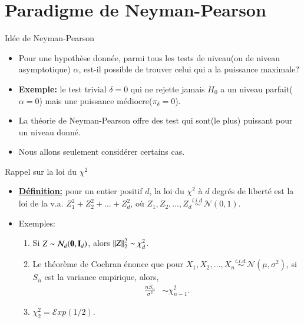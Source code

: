 \section{Paradigme de Neyman-Pearson}
\frame{\sectionpage}
\begin{frame}
    [allowframebreaks]{Idée de Neyman-Pearson}
    \begin{itemize}
        \item Pour une hypothèse donnée, parmi tous les tests de niveau(ou de niveau asymptotique)
        $\alpha$, est-il possible de trouver celui qui a la puissance maximale?
        \item \textbf{Exemple:} le test trivial $\delta = 0$ qui ne rejette jamais $H_0$ a un niveau parfait($\alpha = 0$) 
        mais une puissance médiocre($\pi_\delta = 0$).
        \item La théorie de Neyman-Pearson offre des test qui sont(le plus) puissant pour un niveau donné.
        \item Nous allons seulement considérer certains cas.
    \end{itemize}
\end{frame}
\begin{frame}
    [allowframebreaks]{Rappel sur la loi du $\chi^2$}
    \begin{itemize}
        \item \textbf{\underline{Définition:}} pour un entier positif $d$, la loi du $\chi^2$ à $d$ degrés de liberté est la loi 
        de la v.a. $Z_1^2 + Z_2^2+\dots+ Z_d^2$, où $Z_1, Z_2, \ldots, Z_d\overset{i.i.d.}{\sim}\mathcal{N}(0,1)$.
        \item Exemples:\begin{enumerate}[-]
            \item Si $Z\sim\mathcal{N}_d({\mathbf 0}, \mathbf{I}_d)$, alors $\left\Vert {Z} \right\Vert^2_2 \sim \chi_d^2$.
            \item Le théorème de Cochran énonce que pour $X_1, X_2, \ldots, X_n \overset{i.i.d.}{\sim} 
            \mathcal{N}(\mu, \sigma^2)$, si $S_n$ est la variance empirique, alors,\begin{align*}
                \frac{nS_n}{\sigma^2}&\sim \chi^2_{n-1}.
            \end{align*}
            \item $\chi^2_2 = \mathcal{E}xp(1/2)$.
        \end{enumerate}
    \end{itemize}
\end{frame}
